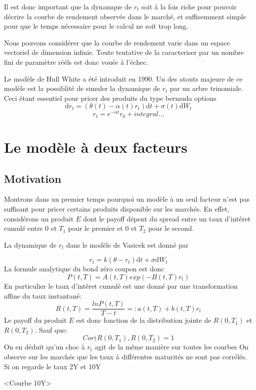 \documentclass[paper=a4, fontsize=11pt]{scrartcl}
\numberwithin{equation}{section}		%
\numberwithin{figure}{section}			%
\numberwithin{table}{section}				%
\begin{document}
Il est donc important que la dynamque de $r_t$ soit à la fois riche pour pouvoir décrire la courbe de rendement observée dans le marché, et suffisemment simple pour que le temps nécessaire pour le calcul ne soit trop long.

Nous pouvons considérer que la courbe de rendement varie dans un espace vectoriel de dimension infinie. Toute tentative de la caracteriser par un nombre fini de paramètre rééls est donc vouée à l'échec.

Le modèle de Hull White a été introduit en 1990.  Un des atouts majeure de ce modèle est la possiblité de simuler la dynamique de $r_t$ par un arbre trinomiale. Ceci étant essentiel pour pricer des produits du type bermuda options
$$ \mathrm{d}r_t =  (\theta(t) - \alpha(t) r_t) \mathrm{d}t + \sigma(t) \mathrm{d} W_t$$
$$ r_t = e^{-\alpha t} r_0 + integral ...$$


\newpage
\section{Le modèle à deux facteurs}
\subsection{Motivation}



Montrons dans un premier temps pourquoi un modèle à un seul facteur n'est pas suffisant pour pricer certains produits disponible sur les marchés. En effet, considérons un produit $E$ dont le payoff  dépent  du spread entre un taux d'intêret cumulé entre $0$ et $T_1$ pour le premier et $0$ et $T_2$ pour le second.

La dynamique de $r_t$ dans le modèle de Vasicek est donné par

$$r_t = k(\theta - r_t)  \mathrm{d}t  + \sigma \mathrm{d}W_t$$
La formule analytique du bond zéro coupon est donc
$$P(t, T) = A(t, T) exp(-B(t, T) r_t)$$
En particulier le taux d'intêret cumulé est une donné par une transformation affine du taux instantané:
$$R(t, T) = \frac{ln P(t, T)}{T-t} =: a(t, T) + b(t, T) r_t$$
Le payoff du produit $E$ est donc fonction de la distribution jointe de $R(0, T_1)$ et $R(0, T_2)$. Sauf que:
$$Cor(R(0, T_1), R(0, T_2) = 1$$
On en déduit qu'un choc à $r_t$ agit de la même manière sur toutes les courbes
On observe sur les marchés que les taux à différentes maturités ne sont pas corrélés. Si on regarde le taux 2Y et 10Y

<Courbe 10Y> 
\end{document}
